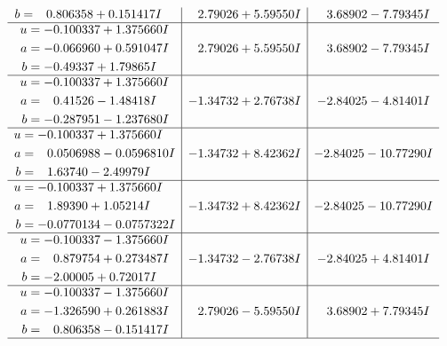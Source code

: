 \documentclass[1p]{elsarticle_modified}
\theoremstyle{definition}
\begin{document}
$$\begin{array}{c|c|c}
\begin{aligned}
b &= \phantom{-}0.806358 + 0.151417 I\end{aligned}
 & \phantom{-}2.79026 + 5.59550 I & \phantom{-}3.68902 - 7.79345 I \\ \hline\begin{aligned}
u &= -0.100337 + 1.375660 I \\
a &= -0.066960 + 0.591047 I \\
b &= -0.49337 + 1.79865 I\end{aligned}
 & \phantom{-}2.79026 + 5.59550 I & \phantom{-}3.68902 - 7.79345 I \\ \hline\begin{aligned}
u &= -0.100337 + 1.375660 I \\
a &= \phantom{-}0.41526 - 1.48418 I \\
b &= -0.287951 - 1.237680 I\end{aligned}
 & -1.34732 + 2.76738 I & -2.84025 - 4.81401 I \\ \hline\begin{aligned}
u &= -0.100337 + 1.375660 I \\
a &= \phantom{-}0.0506988 - 0.0596810 I \\
b &= \phantom{-}1.63740 - 2.49979 I\end{aligned}
 & -1.34732 + 8.42362 I & -2.84025 - 10.77290 I \\ \hline\begin{aligned}
u &= -0.100337 + 1.375660 I \\
a &= \phantom{-}1.89390 + 1.05214 I \\
b &= -0.0770134 - 0.0757322 I\end{aligned}
 & -1.34732 + 8.42362 I & -2.84025 - 10.77290 I \\ \hline\begin{aligned}
u &= -0.100337 - 1.375660 I \\
a &= \phantom{-}0.879754 + 0.273487 I \\
b &= -2.00005 + 0.72017 I\end{aligned}
 & -1.34732 - 2.76738 I & -2.84025 + 4.81401 I \\ \hline\begin{aligned}
u &= -0.100337 - 1.375660 I \\
a &= -1.326590 + 0.261883 I \\
b &= \phantom{-}0.806358 - 0.151417 I\end{aligned}
 & \phantom{-}2.79026 - 5.59550 I & \phantom{-}3.68902 + 7.79345 I\\
 \hline 
 \end{array}$$\newpage$$\begin{array}{c|c|c}  

\end{array}$$
\end{document}
